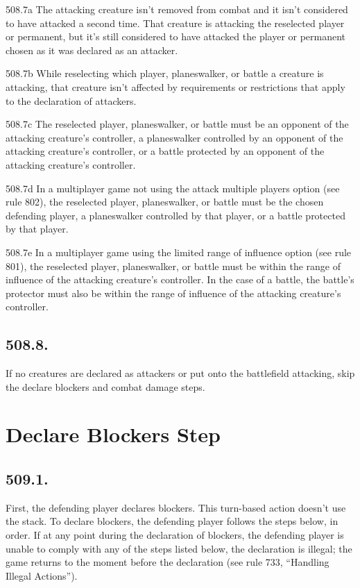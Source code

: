 508.7a The attacking creature isn’t removed from combat and it isn’t considered to have attacked a second time. That creature is attacking the reselected player or permanent, but it’s still considered to have attacked the player or permanent chosen as it was declared as an attacker.

508.7b While reselecting which player, planeswalker, or battle a creature is attacking, that creature isn’t affected by requirements or restrictions that apply to the declaration of attackers.

508.7c The reselected player, planeswalker, or battle must be an opponent of the attacking creature’s controller, a planeswalker controlled by an opponent of the attacking creature’s controller, or a battle protected by an opponent of the attacking creature’s controller.

508.7d In a multiplayer game not using the attack multiple players option (see rule 802), the reselected player, planeswalker, or battle must be the chosen defending player, a planeswalker controlled by that player, or a battle protected by that player.

508.7e In a multiplayer game using the limited range of influence option (see rule 801), the reselected player, planeswalker, or battle must be within the range of influence of the attacking creature’s controller. In the case of a battle, the battle’s protector must also be within the range of influence of the attacking creature’s controller.

\subsection*{508.8.}
If no creatures are declared as attackers or put onto the battlefield attacking, skip the declare blockers and combat damage steps.

\section{Declare Blockers Step}
\subsection*{509.1.}
First, the defending player declares blockers. This turn-based action doesn’t use the stack. To declare blockers, the defending player follows the steps below, in order. If at any point during the declaration of blockers, the defending player is unable to comply with any of the steps listed below, the declaration is illegal; the game returns to the moment before the declaration (see rule 733, “Handling Illegal Actions”).

